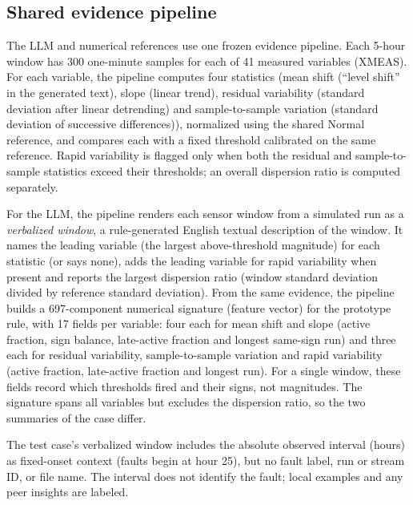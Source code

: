 \documentclass[conference]{IEEEtran}
\begin{document}
\subsection{Shared evidence pipeline}
The LLM and numerical references use one frozen evidence pipeline. Each 5-hour window has 300 one-minute samples for each of 41 measured variables (XMEAS). For each variable, the pipeline computes four statistics (mean shift (``level shift'' in the generated text), slope (linear trend), residual variability (standard deviation after linear detrending) and sample-to-sample variation (standard deviation of successive differences)), normalized using the shared Normal reference, and compares each with a fixed threshold calibrated on the same reference. Rapid variability is flagged only when both the residual and sample-to-sample statistics exceed their thresholds; an overall dispersion ratio is computed separately.

For the LLM, the pipeline renders each sensor window from a simulated run as a \emph{verbalized window}, a rule-generated English textual description of the window. It names the leading variable (the largest above-threshold magnitude) for each statistic (or says none), adds the leading variable for rapid variability when present and reports the largest dispersion ratio (window standard deviation divided by reference standard deviation). From the same evidence, the pipeline builds a 697-component numerical signature (feature vector) for the prototype rule, with 17 fields per variable: four each for mean shift and slope (active fraction, sign balance, late-active fraction and longest same-sign run) and three each for residual variability, sample-to-sample variation and rapid variability (active fraction, late-active fraction and longest run). For a single window, these fields record which thresholds fired and their signs, not magnitudes. The signature spans all variables but excludes the dispersion ratio, so the two summaries of the case differ.

The test case's verbalized window includes the absolute observed interval (hours) as fixed-onset context (faults begin at hour 25), but no fault label, run or stream ID, or file name. The interval does not identify the fault; local examples and any peer insights are labeled.
\end{document}
